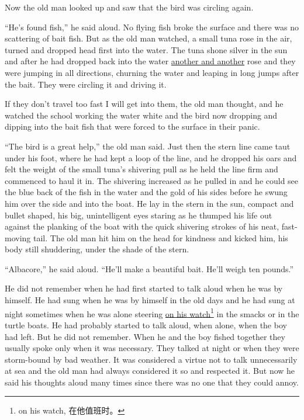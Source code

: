 \documentclass[fontset=ubuntu]{ctexrep}
\newlength{\drop}%
\begin{document}
Now the old man looked up and saw that the bird was circling again.

``He's found fish,'' he said aloud. No flying fish broke the surface and there
was no \gls{scattering} of bait fish. But as the old man watched, a small tuna
rose in the air, turned and dropped head first into the water. The tuna
\gls{shone} \gls{silver} in the sun and after he had dropped back into the water
\uline{another and another} rose and they were jumping in all \glspl{direction},
\gls{churning} the water and \gls{leaping} in long jumps after the bait. They
were circling it and driving it.

If they don't travel too fast I will get into them, the old man thought, and
he watched the school working the water white and the bird now dropping and
dipping into the bait fish that were forced to the surface in their \gls{panic}.

``The bird is a great help,'' the old man said. Just then the stern line
came \gls{taut} under his foot, where he had kept a loop of the line, and he
dropped his oars and felt the weight of the small tuna's shivering
\gls{pull} as he held the line firm and \gls{commenced} to \gls{haul} it in.
The shivering increased as he pulled in and he could see the blue back of
the fish in the water and the gold of his sides before he swung him over the
side and into the boat. He lay in the stern in the sun, \gls{compact} and
\gls{bullet} shaped, his big, \gls{unintelligent} eyes staring as he
\gls{thumped} his life out against the \gls{planking} of the boat with the
quick shivering \glspl{stroke} of his \gls{neat}, fast-moving tail. The old
man hit him on the head for \gls{kindness} and kicked him, his body still
\gls{shuddering}, under the shade of the stern.

``Albacore,'' he said aloud. ``He'll make a beautiful bait. He'll weigh ten pounds.''

He did not remember when he had first started to talk aloud when he was by
himself. He had \gls{sung} when he was by himself in the old days and he had
sung at night sometimes when he was alone steering \uline{on his
  watch}\footnote{on his watch, 在他值班时。} in the \glspl{smack} or in the
turtle boats. He had probably started to talk aloud, when alone, when the
boy had left. But he did not remember. When he and the boy fished together
they usually spoke only when it was necessary. They talked at night or when
they were \gls{storm-bound} by bad weather. It was \gls{considered} a
\gls{virtue} not to talk unnecessarily at sea and the old man had always
considered it so and respected it. But now he said his thoughts \gls{aloud}
many times since there was no one that they could \gls{annoy}.
\end{document}
